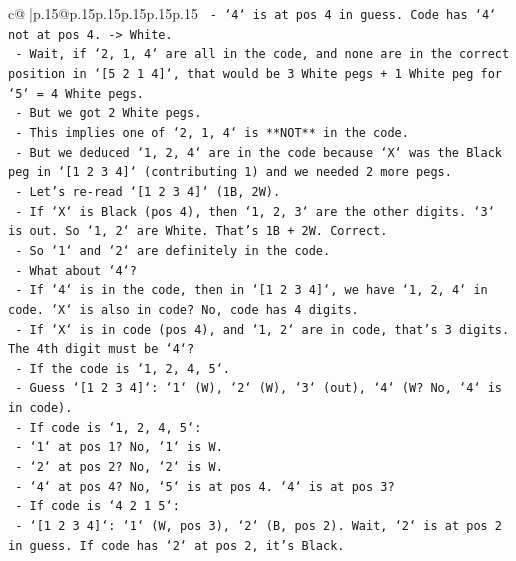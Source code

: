 \documentclass{article}
\begin{document}
{\begin{supertabular}{c@{$\;$}|p{.15\linewidth}@{}p{.15\linewidth}p{.15\linewidth}p{.15\linewidth}p{.15\linewidth}p{.15\linewidth}}
{{{\texttt{            {-} `4` is at pos 4 in guess. Code has `4` not at pos 4. {-}> White.} \\
\texttt{            {-} Wait, if `2, 1, 4` are all in the code, and none are in the correct position in `{[}5 2 1 4{]}`, that would be 3 White pegs + 1 White peg for `5` = 4 White pegs.} \\
\texttt{            {-} But we got 2 White pegs.} \\
\texttt{            {-} This implies one of `2, 1, 4` is **NOT** in the code.} \\
\texttt{            {-} But we deduced `1, 2, 4` are in the code because `X` was the Black peg in `{[}1 2 3 4{]}` (contributing 1) and we needed 2 more pegs.} \\
\texttt{            {-} Let's re{-}read `{[}1 2 3 4{]}` (1B, 2W).} \\
\texttt{                {-} If `X` is Black (pos 4), then `1, 2, 3` are the other digits. `3` is out. So `1, 2` are White. That's 1B + 2W. Correct.} \\
\texttt{                {-} So `1` and `2` are definitely in the code.} \\
\texttt{                {-} What about `4`?} \\
\texttt{                {-} If `4` is in the code, then in `{[}1 2 3 4{]}`, we have `1, 2, 4` in code. `X` is also in code? No, code has 4 digits.} \\
\texttt{                {-} If `X` is in code (pos 4), and `1, 2` are in code, that's 3 digits. The 4th digit must be `4`?} \\
\texttt{                {-} If the code is `1, 2, 4, 5`.} \\
\texttt{                {-} Guess `{[}1 2 3 4{]}`: `1` (W), `2` (W), `3` (out), `4` (W? No, `4` is in code).} \\
\texttt{                {-} If code is `1, 2, 4, 5`:} \\
\texttt{                    {-} `1` at pos 1? No, `1` is W.} \\
\texttt{                    {-} `2` at pos 2? No, `2` is W.} \\
\texttt{                    {-} `4` at pos 4? No, `5` is at pos 4. `4` is at pos 3?} \\
\texttt{                    {-} If code is `4 2 1 5`:} \\
\texttt{                        {-} `{[}1 2 3 4{]}`: `1` (W, pos 3), `2` (B, pos 2). Wait, `2` is at pos 2 in guess. If code has `2` at pos 2, it's Black.} \\
}}}
\end{supertabular}}
\end{document}
